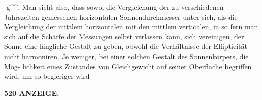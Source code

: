 \documentclass[12pt,a4paper]{article}
\begin{document}
 -g\textasciicircum{}\textasciicircum{}.  Man  sieht  also,  dass  sowol  die  Vergleichung  der  zu  verschiedenen Jahrszeiten  gemessenen  horizontalen  Sonnendurchmesser  unter  sich,  als  die  Vergleichung  der  mittlem horizontalen  mit  den  mittlem  verticalen,  in  so  fern  man  sich  auf  die  Schärfe  der  Messungen  selbst verlassen  kann,  sich  vereinigen,  der  Sonne  eine  längliche  Gestalt  zu  geben,  obwohl  die  Verhältnisse der  Ellipticität  nicht  harmoniren.  Je  weniger,  bei  einer  solchen  Gestalt  des  Sonnenkörpers,  die  Mög- lichkeit eines  Zustandes  von  Gleichgewicht  auf  seiner  Oberfläche  begriffen  wird,  um  so  begieriger  wird

\vspace{0.5em}


\noindent\textbf{520  ANZEIGE.}
\end{document}
